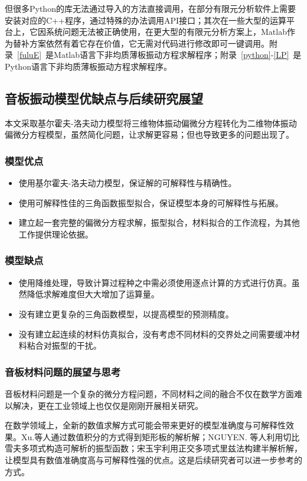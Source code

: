 \documentclass[withoutpreface,bwprint]{cumcmthesis} %
\begin{document}
但很多Python的库无法通过导入的方法直接调用，在部分有限元分析软件上需要安装对应的C++程序，通过特殊的办法调用API接口；其次在一些大型的运算平台上，它因系统问题无法被正确使用，在更大型的有限元分析方案上，Matlab作为替补方案依然有着它存在价值，它无需对代码进行修改即可一键调用。附录~\ref{fuluE}~是Matlab语言下非均质薄板振动方程求解程序；附录~\ref{python}-\ref{LP}~是Python语言下非均质薄板振动方程求解程序。
\subsection{音板振动模型优缺点与后续研究展望}
本文采取基尔霍夫-洛夫动力模型将三维物体振动偏微分方程转化为二维物体振动偏微分方程模型，虽然简化问题，让求解更容易；但也导致更多的问题出现了。
\subsubsection{模型优点}
\begin{itemize}
	\item 使用基尔霍夫-洛夫动力模型，保证解的可解释性与精确性。
	\item 使用可解释性佳的三角函数振型拟合，保证模型本身的可解释性与拓展。
	\item 建立起一套完整的偏微分方程求解，振型拟合，材料拟合的工作流程，为其他工作提供理论依据。
\end{itemize}
\subsubsection{模型缺点}
\begin{itemize}
	\item 使用降维处理，导致计算过程种之中需必须使用逐点计算的方式进行仿真。虽然降低求解难度但大大增加了运算量。
	\item 没有建立更复杂的三角函数模型，以提高模型的预测精度。
	\item 没有建立起连续的材料仿真拟合，没有考虑不同材料的交界处之间需要缓冲材料粘合对振型的干扰。
\end{itemize}
\subsubsection{音板材料问题的展望与思考}
音板材料问题是一个复杂的微分方程问题，不同材料之间的融合不仅在数学方面难以解决，更在工业领域上也仅仅是刚刚开展相关研究。

在数学领域上，全新的数值求解方式可能会带来更好的模型准确度与可解释性效果。Xu.等人\cite{ref8}通过数值积分的方式得到矩形板的解析解；NGUYEN. 等人\cite{ref7}利用切比雪夫多项式构造可解析的振型函数；宋玉宇\cite{ref5}利用正交多项式里兹法构建半解析解，让模型具有数值准确度高与可解释性强的优点。这是后续研究者可以进一步参考的方式。
\end{document}
